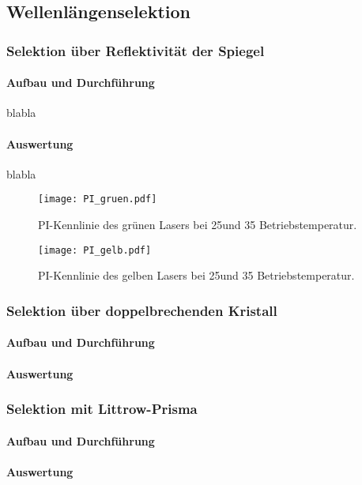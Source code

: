 \subsection{Wellenlängenselektion}

\subsubsection{Selektion über Reflektivität der Spiegel}

\paragraph{Aufbau und Durchführung}
blabla

\paragraph{Auswertung}
blabla

\begin{figure}[H]
\begin{center}
  \texttt{[image: PI\_gruen.pdf]}
  \caption{PI-Kennlinie des grünen Lasers bei 25\grad und 35\grad
  Betriebstemperatur.}
  \label{img:PI_gruen}
\end{center}
\end{figure}


\begin{figure}[H]
\begin{center}
  \texttt{[image: PI\_gelb.pdf]}
  \caption{PI-Kennlinie des gelben Lasers bei 25\grad und 35\grad
  Betriebstemperatur.}
  \label{img:PI_gelb}
\end{center}
\end{figure}



\subsubsection{Selektion über doppelbrechenden Kristall}


\paragraph{Aufbau und Durchführung}

\paragraph{Auswertung}

\subsubsection{Selektion mit Littrow-Prisma}


\paragraph{Aufbau und Durchführung}

\paragraph{Auswertung}

